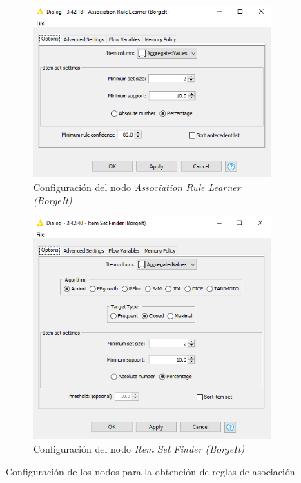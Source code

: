 \begin{figure}[H]
	\centering
	\begin{subfigure}[b]{0.4\linewidth}
		\includegraphics[width=\linewidth]{figuras/Jenn/config-assoc-rules}
		\caption{Configuración del nodo \textit{Association Rule Learner (BorgeIt)}}
		\label{fig:conf-assoc-rules}
	\end{subfigure}
	\hfill
	\begin{subfigure}[b]{0.4\linewidth}
		\includegraphics[width=\linewidth]{figuras/Jenn/conf-itemset}
		\caption{Configuración del nodo \textit{Item Set Finder (BorgeIt)}}
		\label{fig:config-itemset}
	\end{subfigure}
	\caption{Configuración de los nodos para la obtención de reglas de asociación}
	\label{fig:conf-reglas}
\end{figure}

